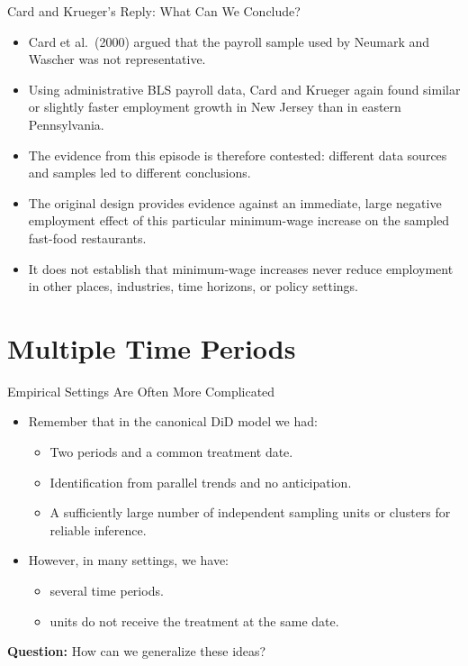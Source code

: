 \documentclass[11pt,aspectratio=169]{beamer}
\begin{document}
\begin{frame}{Card and Krueger's Reply: What Can We Conclude?}
\small
\begin{itemize}
  \item Card et al.\ (2000) argued that the payroll sample used by Neumark and Wascher was not representative.
  \item Using administrative BLS payroll data, Card and Krueger again found similar or slightly faster employment growth in New Jersey than in eastern Pennsylvania.
  \item The evidence from this episode is therefore contested: different data sources and samples led to different conclusions.
  \item The original design provides evidence against an immediate, large negative employment effect of this particular minimum-wage increase on the sampled fast-food restaurants.
  \item It does not establish that minimum-wage increases never reduce employment in other places, industries, time horizons, or policy settings.
\end{itemize}
\end{frame}


\section{Multiple Time Periods}

\begin{frame}{Empirical Settings Are Often More Complicated}
\begin{itemize}
  \item Remember that in the canonical DiD model we had:
  \begin{itemize}
    \item Two periods and a common treatment date.
    \item Identification from parallel trends and no anticipation.
    \item A sufficiently large number of independent sampling units or clusters for reliable inference.
  \end{itemize}
  \item However, in many settings, we have:
  \begin{itemize}
    \item several time periods.
    \item units do not receive the treatment at the same date.
  \end{itemize}
\end{itemize}
\textbf{Question:} How can we generalize these ideas?
\end{frame}
\end{document}
